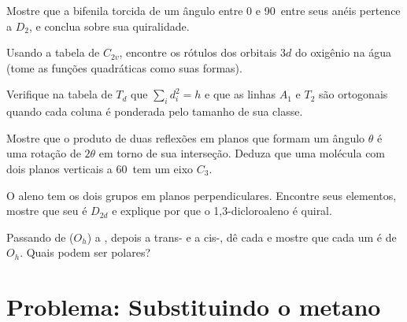 \begin{exercise}[$\star\star$]\label{exo:b3:point-groups:7}
Mostre que a bifenila torcida de um ângulo entre 0 e 90\textdegree\ entre
seus anéis pertence a $D_2$, e conclua sobre sua quiralidade.
\end{exercise}

\begin{exercise}[$\star\star$]\label{exo:b3:point-groups:8}
Usando a tabela de $C_{2v}$, encontre os rótulos dos orbitais $3d$ do oxigênio na
água (tome as funções quadráticas como suas formas).
\end{exercise}

\begin{exercise}[$\star\star$]\label{exo:b3:point-groups:9}
Verifique na tabela de $T_d$ que $\sum_id_i^2 = h$ e que as linhas $A_1$ e $T_2$
são ortogonais quando cada coluna é ponderada pelo tamanho de sua classe.
\end{exercise}

\begin{exercise}[$\star\star\star$]\label{exo:b3:point-groups:10}
Mostre que o produto de duas reflexões em planos que formam um ângulo
$\theta$ é uma rotação de $2\theta$ em torno de sua interseção. Deduza que uma
molécula com dois planos verticais a 60\textdegree\ tem um eixo $C_3$.
\end{exercise}

\begin{exercise}[$\star\star\star$]\label{exo:b3:point-groups:11}
O aleno  tem os dois grupos  em planos perpendiculares.
Encontre seus elementos, mostre que seu  é $D_{2d}$ e explique por
que o 1,3-dicloroaleno  é quiral.
\end{exercise}

\begin{exercise}[$\star\star\star$]\label{exo:b3:point-groups:12}
Passando de  ($O_h$) a , depois a trans- e a
cis-, dê cada  e mostre que cada um é  de
$O_h$. Quais podem ser polares?
\end{exercise}

\section{Problema: Substituindo o metano}

